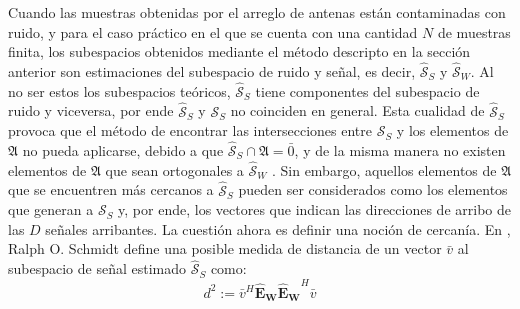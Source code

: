 Cuando las muestras obtenidas por el arreglo de antenas están contaminadas con ruido, y para el caso práctico en el que se cuenta con una cantidad $N$ de muestras finita, los subespacios obtenidos mediante el método descripto en la sección anterior son estimaciones del subespacio de ruido y señal, es decir, $\hat{\mathcal{S}}_S$ y $\hat{\mathcal{S}}_W$. Al no ser estos los subespacios teóricos, $\hat{\mathcal{S}}_S$ tiene componentes del subespacio de ruido y viceversa, por ende $\hat{\mathcal{S}}_S$ y $\mathcal{S}_S$ no coinciden en general. Esta cualidad de $\hat{\mathcal{S}}_S$ provoca que el método de encontrar las intersecciones entre $\mathcal{S}_S$ y los elementos de $\mathfrak{A}$ no pueda aplicarse, debido a que $\hat{\mathcal{S}}_S \cap \mathfrak{A}=\bar{0}$, y de la misma manera no existen elementos de $\mathfrak{A}$ que sean ortogonales a $\hat{\mathcal{S}}_W$ \cite{bib:esprit_roy}. Sin embargo, aquellos elementos de $\mathfrak{A}$ que se encuentren más cercanos a $\hat{\mathcal{S}}_S$ pueden ser considerados como los elementos que generan a $\mathcal{S}_S$ y, por ende, los vectores que indican las direcciones de arribo de las $D$ señales arribantes. La cuestión ahora es definir una noción de cercanía.
En \cite{bib:music_schmidt}, Ralph O. Schmidt define una posible medida de distancia de un vector $\bar{v}$ al subespacio de señal estimado $\hat{\mathcal{S}}_S$ como:
\begin{equation}
    d^2:= \bar{v}^H\mathbf{\hat{E}_W}\mathbf{\hat{E}_W}^H\bar{v}
\end{equation}

